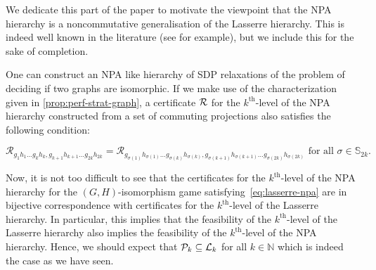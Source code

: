 \documentclass[11pt,a4paper]{article}
\theoremstyle{plain}
\theoremstyle{remark}
\theoremstyle{definition}
\def\calP{{\mathcal P}} \def\calQ{{\mathcal Q}} \def\calR{{\mathcal R}}
\begin{document}
  We dedicate this part of the paper to motivate the viewpoint that the NPA hierarchy is a noncommutative generalisation of the Lasserre hierarchy. This is indeed well known in the literature (see \cite{NPA-2, cstar-hierarchy} for example), but we include this for the sake of completion. 

  One can construct an NPA like hierarchy of SDP relaxations of the problem of deciding if two graphs are isomorphic. If we make use of the characterization given in \cref{prop:perf-strat-graph}, a certificate $\cal{R}$ for the $k^{\text{th}}$-level of the NPA hierarchy constructed from a set of commuting projections also satisfies the following condition:
  
  \begin{equation}\label{eq:lasserre-npa}
      \calR_{g_1h_1 \dots g_kh_k, g_{k+1}h_{k+1}\dots g_{2k}h_{2k} } = \calR_{g_{\sigma(1)}h_{\sigma(1)}\dots g_{\sigma(k)}h_{\sigma(k)}, g_{\sigma(k+1)}h_{\sigma(k+1)}\dots g_{\sigma(2k)}h_{\sigma(2k)}} \text{ for all } \sigma \in \mathbb{S}_{2k}. 
  \end{equation} 

  Now, it is not too difficult to see that the certificates for the $k^{\text{th}}$-level of the NPA hierarchy for the $(G,H)$-isomorphism game satisfying~\eqref{eq:lasserre-npa} are in bijective correspondence with certificates for the $k^{\text{th}}$-level of the Lasserre hierarchy. In particular, this implies that the feasibility of the $k^{\text{th}}$-level of the Lasserre hierarchy also implies the feasibility of the $k^{\text{th}}$-level of the NPA hierarchy. Hence, we should expect that $\calP_k \subseteq \calL_k$ for all $k \in \mathbb{N}$ which is indeed the case as we have seen. 
\end{document}
